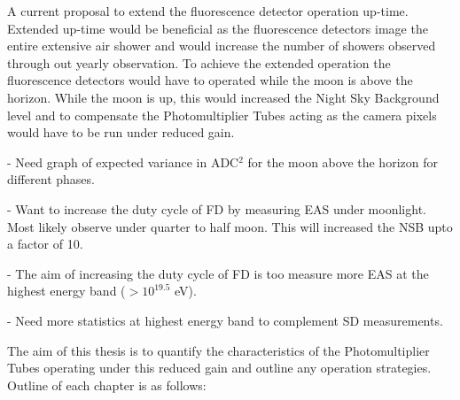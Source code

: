 A current proposal to extend the fluorescence detector operation up-time. Extended up-time would be beneficial as the fluorescence detectors image the entire extensive air shower and would increase the number of showers observed through out yearly observation. To achieve the extended operation the fluorescence detectors would have to operated while the moon is above the horizon. While the moon is up, this would increased the Night Sky Background level and to compensate the Photomultiplier Tubes acting as the camera pixels would have to be run under reduced gain. 

- Need graph of expected variance in ADC$^2$ for the moon above the horizon for different phases.

- Want to increase the duty cycle of FD by measuring EAS under moonlight. Most likely observe under quarter to half moon. This will increased the NSB upto a factor of 10.

- The aim of increasing the duty cycle of FD is too measure more EAS at the highest energy band ($> 10^{19.5}$ eV).

- Need more statistics at highest energy band to complement SD measurements.

The aim of this thesis is to quantify the characteristics of the Photomultiplier Tubes operating under this reduced gain and outline any operation strategies. Outline of each chapter is as follows:

